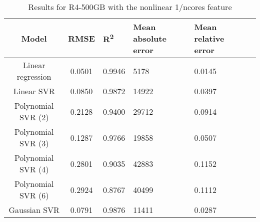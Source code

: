 \begin{table}[H]
\centering
\begin{adjustbox}{center}
\begin{tabular}{c | c M{1.2cm} M{2.5cm} M{2.5cm} M{1.8cm}}
Model & RMSE & R\textsuperscript{2} & Mean absolute error & Mean relative error \tabularnewline
\hline
Linear regression & 0.0501 & 0.9946 &   5178 & 0.0145 \\
Linear SVR & 0.0850 & 0.9872 &  14922 & 0.0397 \\
Polynomial SVR (2) & 0.2128 & 0.9400 &  29712 & 0.0914 \\
Polynomial SVR (3) & 0.1287 & 0.9766 &  19858 & 0.0507 \\
Polynomial SVR (4) & 0.2801 & 0.9035 &  42883 & 0.1152 \\
Polynomial SVR (6) & 0.2924 & 0.8767 &  40499 & 0.1112 \\
Gaussian SVR & 0.0791 & 0.9876 &  11411 & 0.0287 \\
\end{tabular}
\end{adjustbox}
\\
\caption{Results for R4-500GB with the nonlinear 1/ncores feature}
\label{tab:all_nonlinear_R4_500}
\end{table}
